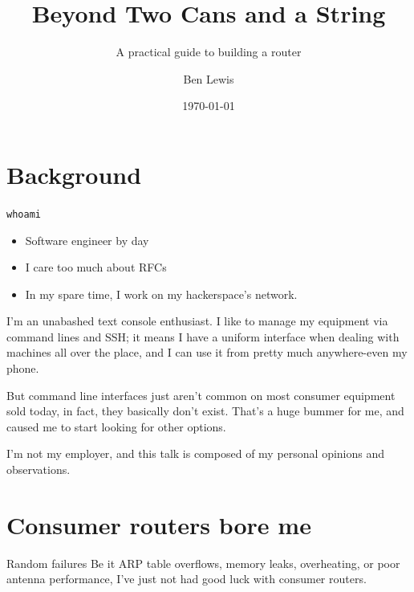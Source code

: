 \documentclass[bigger,aspectratio=169]{beamer}
\author{Ben Lewis}
\date{\today}
\title{Beyond Two Cans and a String}
\subtitle{A practical guide to building a router}
\begin{document}
\maketitle

\section{Background}
\label{sec:orgb37081c}

\begin{frame}[fragile,label={sec:org06c16c6}]{\texttt{whoami}}
  \begin{itemize}
  \item Software engineer by day
  \item I care too much about RFCs
  \item In my spare time, I work on my hackerspace's network.
  \end{itemize}
\begin{notes}
I'm an unabashed text console enthusiast. I like to manage my equipment via
command lines and SSH; it means I have a uniform interface when dealing with
machines all over the place, and I can use it from pretty much anywhere-even my
phone.

But command line interfaces just aren't common on most consumer equipment sold
today, in fact, they basically don't exist. That's a huge bummer for me, and
caused me to start looking for other options.
\end{notes}
\end{frame}

\begin{frame}
  I'm not my employer, and this talk is composed of my personal opinions and observations.
\end{frame}

\section{Consumer routers bore me}
\label{sec:org769d52d}

\frame{\sectionpage}

\begin{frame}[label={sec:org6db040a}]{Random failures}
Be it ARP table overflows, memory leaks, overheating, or poor antenna
performance, I've just not had good luck with consumer routers.
\end{frame}
\end{document}
